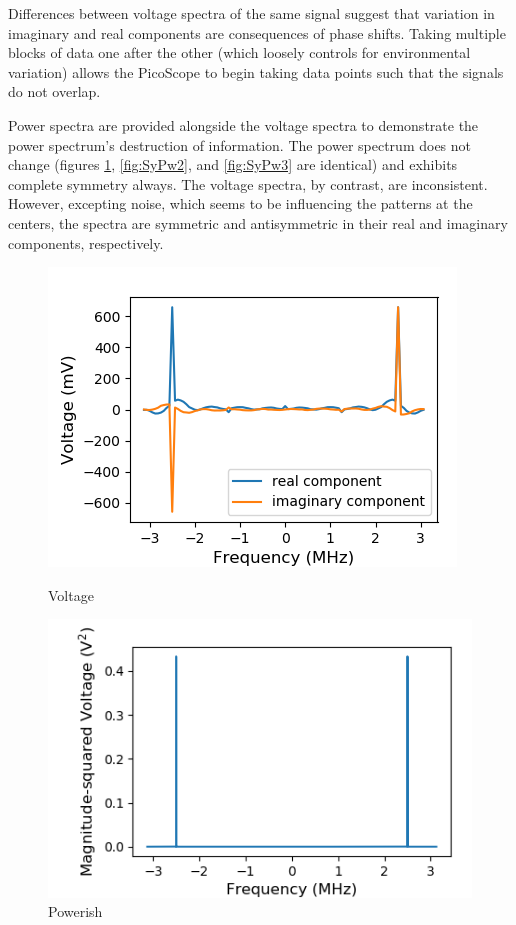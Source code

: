 \documentclass[a4paper]{article}
\begin{document}
Differences between voltage spectra of the same signal suggest that variation in imaginary and real components are consequences of phase shifts. Taking multiple blocks of data one after the other (which loosely controls for environmental variation) allows the PicoScope to begin taking data points such that the signals do not overlap.

Power spectra are provided alongside the voltage spectra to demonstrate the power spectrum's destruction of information. The power spectrum does not change (figures \ref{fig:SyPw1}, \ref{fig:SyPw2}, and \ref{fig:SyPw3} are identical) and exhibits complete symmetry always. The voltage spectra, by contrast, are inconsistent. However, excepting noise, which seems to be influencing the patterns at the centers, the spectra are symmetric and antisymmetric in their real and imaginary components, respectively.


\begin{figure}
\centering
\begin{minipage}{.5\textwidth}
	\centering
	\includegraphics[width=.8\linewidth]{5-3/volt1}
	\caption{Voltage}
	\label{fig:Volt1}
\end{minipage}%
\begin{minipage}{.5\textwidth}
	\centering
	\includegraphics[width=.8\linewidth]{5-3/pow1}
	\caption{Powerish}
	\label{fig:SyPw1}
\end{minipage}
\end{figure}
\end{document}
